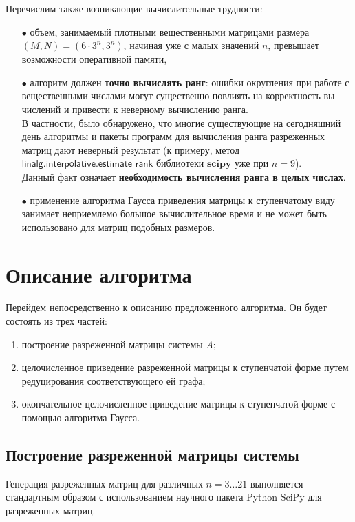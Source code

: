 \noindent Перечислим также возникающие вычислительные трудности:
\begin{itemize}
	\item[$\bullet$]{объем, занимаемый плотными вещественными матрицами размера $(M, N) = (6 \cdot 3^{n}, 3^{n})$, начиная уже с малых значений $n$, превышает возможности оперативной памяти,}
	\item[$\bullet$]{алгоритм должен \textbf{точно вычислять ранг}: ошибки округления при работе с вещественными числами могут существенно повлиять на корректность вы­числений и привести к неверному вычислению ранга.}\\[18pt]
\noindent В частности, было обнаружено, что многие существующие на сего­дняшний день алгоритмы и пакеты программ для вычисления ран­га разреженных матриц дают неверный результат (к примеру, метод $\mathsf{linalg.interpolative.estimate\_rank}$ библиотеки $\mathbf{scipy}$ уже при $n = 9$).\\[18pt]
Данный факт означает \textbf{необходимость вычисления ранга в целых числах}.
	\item[$\bullet$]{применение алгоритма Гаусса приведения матрицы к ступенчатому ви­ду занимает неприемлемо большое вычислительное время и не может быть использовано для матриц подобных размеров.}
\end{itemize}

\clearpage
\section{Описание алгоритма}\label{sec:ch4/sect3}

Перейдем непосредственно к описанию предложенного алгоритма.
Он будет состоять из трех частей:
\begin{enumerate}
	\item{построение разреженной матрицы системы $A$};
	\item{целочисленное приведение разреженной матрицы к ступенчатой форме путем редуцирования соответствующего ей графа};
	\item{окончательное целочисленное приведение матрицы к ступенчатой форме с помощью
		алгоритма Гаусса}.
\end{enumerate}

\subsection{Построение разреженной матрицы системы}\label{subsec:ch4/subsect1}
Генерация разреженных матриц для различных $n = 3\dots21$ выполняется стандартным
образом с использованием научного пакета Python SciPy для разреженных матриц.

